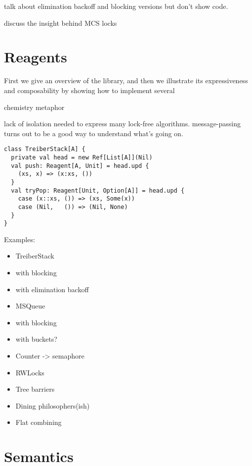 \documentclass[preprint]{sigplanconf}
\begin{document}
talk about elimination backoff and blocking versions but don't show code.

discuss the insight behind MCS locks

\section{Reagents}
\label{sec:reagents}

First we give an overview of the library, and then we illustrate its
expressiveness and composability by showing how to implement several 
 
chemistry metaphor

lack of isolation needed to express many lock-free algorithms.
message-passing turns out to be a good way to understand what's going on.

\begin{lstlisting}
class TreiberStack[A] {
  private val head = new Ref[List[A]](Nil)
  val push: Reagent[A, Unit] = head.upd {
    (xs, x) => (x:xs, ())
  }
  val tryPop: Reagent[Unit, Option[A]] = head.upd {
    case (x::xs, ()) => (xs, Some(x))
    case (Nil,   ()) => (Nil, None)
  }
}
\end{lstlisting}

Examples:

\begin{itemize}
\item TreiberStack
\item with blocking
\item with elimination backoff
\item MSQueue
\item with blocking
\item with buckets?
\item Counter -> semaphore
\item RWLocks
\item Tree barriers
\item Dining philosophers(ish)
\item Flat combining
\end{itemize}

\section{Semantics}
\label{sec:semantics}

\newcommand{\ra}{\rightarrow}
\newcommand{\gives}{\vdash}
\newcommand{\proves}{\vdash}
\newcommand{\kw}[1]{\textsf{#1}}
\newcommand{\GA}{\ |\ }
\newcommand{\step}{\longrightarrow}
\newcommand{\cstep}[1]{\stackrel{#1}{\Longrightarrow}}
\end{document}
